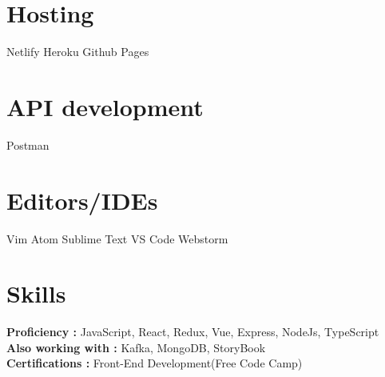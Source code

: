 \documentclass[espanol]{cv-style}     %
\begin{document}
\begin{aside}
\section{Hosting}
\vspace{0.3cm}
Netlify
Heroku
Github Pages
\vspace{0.4cm}
%
\section{API development}
\vspace{0.3cm}
Postman
\vspace{0.4cm}
%
\section{Editors/IDEs}
\vspace{0.3cm}
Vim
Atom
Sublime Text
VS Code
Webstorm
\vspace{0.4cm}
%
\end{aside}

\vspace{0.2cm}
\section{Skills}
  \vspace{-0.2cm}
\textbf{Proficiency :} JavaScript, React, Redux, Vue, Express, NodeJs, TypeScript
  \vspace{0.2cm}
\\
\textbf{Also working with :} Kafka, MongoDB, StoryBook
  \vspace{0.2cm}
\\
\textbf{Certifications :} Front-End Development(Free Code Camp)


\end{document}
